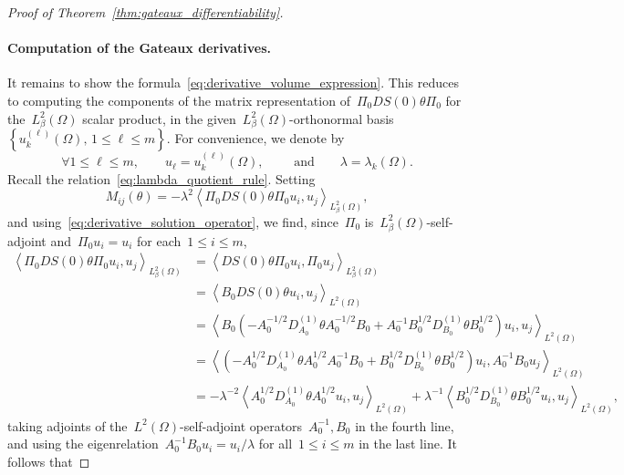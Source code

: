 \documentclass[a4]{article}
\newcommand{\1}{\mathbbm 1}
\begin{document}
\begin{proof}[Proof of Theorem~\ref{thm:gateaux_differentiability}]
    \paragraph{Computation of the Gateaux derivatives.}
    It remains to show the formula~\eqref{eq:derivative_volume_expression}. This reduces to computing the components of the matrix representation of~$\Pi_0 D S(0) \theta \Pi_0$ for the~$L^2_\beta(\Omega)$ scalar product, in the given~$L^2_\beta(\Omega)$-orthonormal basis~$\left\{u_k^{(\ell)}(\Omega),\, 1\leq \ell \leq m\right\}$.
    For convenience, we denote by
    \[\forall 1\leq \ell\leq m,\qquad u_\ell = u_k^{(\ell)}(\Omega),\qquad\text{ and}\qquad \lambda = \lambda_k(\Omega).\]
    Recall the relation~\eqref{eq:lambda_quotient_rule}. Setting
    \begin{equation}
        M_{ij}(\theta) = -\lambda^2\left\langle \Pi_0 D S(0) \theta \Pi_0 u_i,u_j\right\rangle_{L^2_\beta(\Omega)},
    \end{equation}
    and using~\eqref{eq:derivative_solution_operator}, we find, since~$\Pi_0$ is~$L^2_\beta(\Omega)$-self-adjoint and~$\Pi_0 u_i = u_i$ for each~$1\leq i\leq m$,
    \begin{equation}
        \begin{aligned}
            \left\langle \Pi_0 D S(0) \theta \Pi_0 u_i,u_j\right\rangle_{L^2_\beta(\Omega)} &= \left\langle D S(0) \theta \Pi_0 u_i,\Pi_0 u_j\right\rangle_{L^2_\beta(\Omega)}\\
            &=\left\langle B_0 D S(0) \theta u_i,u_j\right\rangle_{L^2(\Omega)}\\
             &= \left\langle B_0\left( -A_0^{-1/2} D_{A_0}^{(1)}\theta A_0^{-1/2}B_0 + A_0^{-1}B_0^{1/2}D_{B_0}^{(1)}\theta B_0^{1/2}\right)u_i, u_j\right\rangle_{L^2(\Omega)}\\
            &= \left\langle \left(-A_0^{1/2}D_{A_0}^{(1)}\theta A_0^{1/2}A_0^{-1}B_0 + B_0^{1/2}D_{B_0}^{(1)}\theta B_0^{1/2}\right) u_i,A_0^{-1} B_0 u_j\right\rangle_{L^2(\Omega)}\\
            &= -\lambda^{-2}\left\langle A_0^{1/2}D_{A_0}^{(1)}\theta A_0^{1/2}u_i,u_j\right\rangle_{L^2(\Omega)} + \lambda^{-1}\left\langle B_0^{1/2}D_{B_0}^{(1)}\theta B_0^{1/2} u_i,u_j\right\rangle_{L^2(\Omega)},
        \end{aligned}
    \end{equation}
    taking adjoints of the~$L^2(\Omega)$-self-adjoint operators~$A_0^{-1},B_0$ in the fourth line, and using the eigenrelation~$A_0^{-1}B_0 u_i = u_i/\lambda$ for all~$1\leq i\leq m$ in the last line. It follows that

\end{proof}
\end{document}
